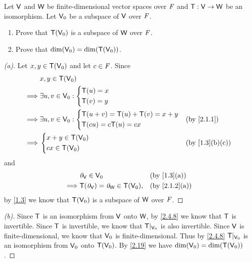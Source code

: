 \begin{ex}\label{ex:2.4.17}
  Let \(\mathsf{V}\) and \(\mathsf{W}\) be finite-dimensional vector spaces over \(\mathit{F}\) and \(\mathsf{T} : \mathsf{V} \to \mathsf{W}\) be an isomorphism.
  Let \(\mathsf{V}_0\) be a subspace of \(\mathsf{V}\) over \(\mathit{F}\).
  \begin{enumerate}
    \item Prove that \(\mathsf{T}(\mathsf{V}_0)\) is a subspace of \(\mathsf{W}\) over \(\mathit{F}\).
    \item Prove that \(\dim(\mathsf{V}_0) = \dim(\mathsf{T}(\mathsf{V}_0))\).
  \end{enumerate}
\end{ex}

\begin{proof}[(a)]
  Let \(x, y \in \mathsf{T}(\mathsf{V}_0)\) and let \(c \in \mathit{F}\).
  Since
  \begin{align*}
             & x, y \in \T(\V_0)                                         \\
    \implies & \exists u, v \in \V_0 : \begin{dcases}
                                         \T(u) = x \\
                                         \T(v) = y
                                       \end{dcases}                     \\
    \implies & \exists u, v \in \V_0 : \begin{dcases}
                                         \T(u + v) = \T(u) + \T(v) = x + y \\
                                         \T(cu) = c \T(u) = cx
                                       \end{dcases} &  & \by{2.1.1} \\
    \implies & \begin{dcases}
                 x + y \in \T(\V_0) \\
                 cx \in \T(\V_0)
               \end{dcases}                  &  & \by{1.3}[b,c]
  \end{align*}
  and
  \begin{align*}
             & \zv_{\V} \in \V_0                     &  & \by{1.3}[a]   \\
    \implies & \T(\zv_{\V}) = \zv_{\W} \in \T(\V_0), &  & \by{2.1.2}[a]
  \end{align*}
  by \cref{1.3} we know that \(\mathsf{T}(\mathsf{V}_0)\) is a subspace of \(\mathsf{W}\) over \(\mathit{F}\).
\end{proof}

\begin{proof}[(b)]
  Since \(\mathsf{T}\) is an isomorphism from \(\mathsf{V}\) onto \(\mathsf{W}\), by \cref{2.4.8} we know that \(\mathsf{T}\) is invertible.
  Since \(\mathsf{T}\) is invertible, we know that \(\mathsf{T}|_{\mathsf{V}_0}\) is also invertible.
  Since \(\mathsf{V}\) is finite-dimensional, we know that \(\mathsf{V}_0\) is finite-dimensional.
  Thus by \cref{2.4.8} \(\mathsf{T}|_{\mathsf{V}_0}\) is an isomorphism from \(\mathsf{V}_0\) onto \(\mathsf{T}(\mathsf{V}_0)\).
  By \cref{2.19} we have \(\dim(\mathsf{V}_0) = \dim(\mathsf{T}(\mathsf{V}_0))\).
\end{proof}

